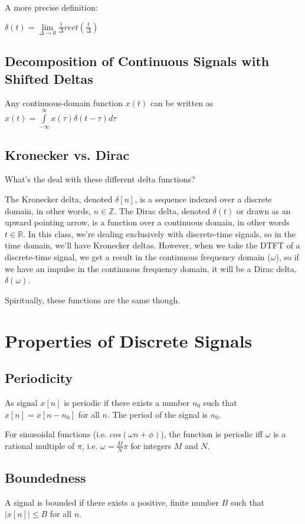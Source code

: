 \documentclass[11pt]{article}
\begin{document}
A more precise definition:

$\delta(t) = \lim\limits_{\Delta\rightarrow 0} \frac{1}{\Delta} rect(\frac{t}{\Delta})$

\subsection{Decomposition of Continuous Signals with Shifted Deltas}
Any continuous-domain function $x(t)$ can be written as $x(t)=\int\limits_{-\infty}^\infty x(\tau)\delta(t-\tau)d\tau$


\subsection{Kronecker vs. Dirac}

What's the deal with these different delta functions? 

The Kronecker delta, denoted $\delta[n]$, is a sequence indexed over a discrete domain, in other words, $n \in \mathbb{Z}$. The Dirac delta, denoted $\delta(t)$ or drawn as an upward pointing arrow, is a function over a continuous domain, in other words $t \in \mathbb{R}$. In this class, we're dealing exclusively with discrete-time signals, so in the time domain, we'll have Kronecker deltas. However, when we take the DTFT of a discrete-time signal, we get a result in the continuous frequency domain ($\omega$), so if we have an impulse in the continuous frequency domain, it will be a Dirac delta, $\delta(\omega)$.

Spiritually, these functions are the same though. 


\section{Properties of Discrete Signals}

\subsection{Periodicity}
As signal $x[n]$ is periodic if there exists a number $n_0$ such that $x[n]=x[n-n_0]$ for all $n$. The period of the signal is $n_0$.

For sinusoidal functions (i.e. $cos\left(\omega n + \phi\right)$), the function is periodic iff $\omega$ is a rational multiple of $\pi$, i.e. $\omega = \frac{M}{N}\pi$ for integers $M$ and $N$.

\subsection{Boundedness}
A signal is bounded if there exists a positive, finite number $B$ such that $|x[n]|  \leq B$ for all $n$. 
\end{document}
